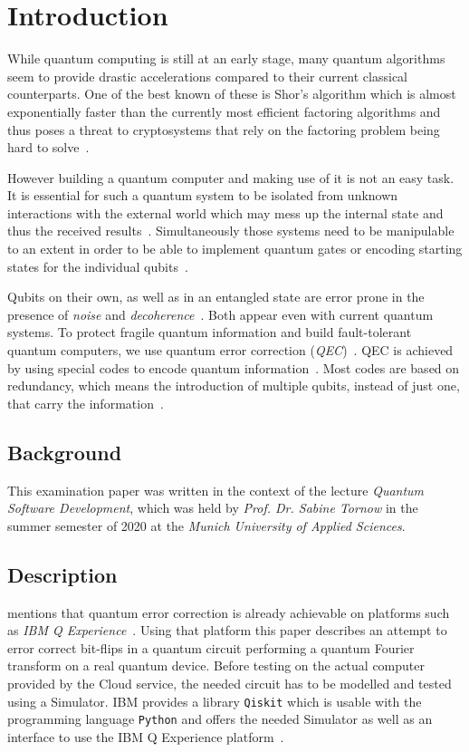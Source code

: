 \section{Introduction}
\label{sec:introduction}

While quantum computing is still at an early stage, many quantum algorithms seem to provide drastic accelerations compared to their current classical counterparts.
One of the best known of these is Shor's algorithm which is almost exponentially faster than the currently most efficient factoring algorithms and thus poses a threat to cryptosystems that rely on the factoring problem being hard to solve~\cite{Shor}.

However building a quantum computer and making use of it is not an easy task.
It is essential for such a quantum system to be isolated from unknown interactions with the external world which may mess up the internal state and thus the received results~\cite[p. 34]{Milburn}.
Simultaneously those systems need to be manipulable to an extent in order to be able to implement quantum gates or encoding starting states for the individual qubits~\cite{Matuschak2019}.

Qubits on their own, as well as in an entangled state are error prone in the presence of \emph{noise} and \emph{decoherence}~\cite[p. 34]{Milburn}.
Both appear even with current quantum systems.
To protect fragile quantum information and build fault-tolerant quantum computers, we use quantum error correction (\emph{QEC})~\cite[p. 46998]{Li}.
QEC is achieved by using special codes to encode quantum information~\cite[p. 113]{deBrito}.
Most codes are based on redundancy, which means the introduction of multiple qubits, instead of just one, that carry the information~\cite[p. 113]{deBrito}.

\subsection{Background}
\label{subsec:background}

This examination paper was written in the context of the lecture \emph{Quantum Software Development}, which was held by \emph{Prof. Dr. Sabine Tornow} in the summer semester of 2020 at the \emph{Munich University of Applied Sciences}.

\subsection{Description}

 mentions that quantum error correction is already achievable on platforms such as \emph{IBM Q Experience}~\cite{IBMQExperience}.
Using that platform this paper describes an attempt to error correct bit-flips in a quantum circuit performing a quantum Fourier transform on a real quantum device.
Before testing on the actual computer provided by the Cloud service, the needed circuit has to be modelled and tested using a Simulator.
IBM provides a library \texttt{Qiskit} which is usable with the programming language \texttt{Python} and offers the needed Simulator as well as an interface to use the IBM Q Experience platform~\cite{Qiskit}.

